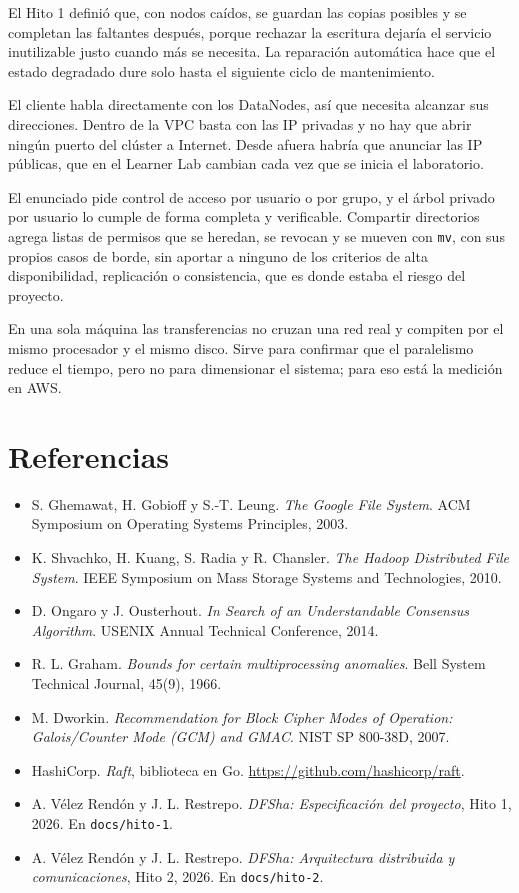 \documentclass[10pt]{article}
\begin{document}
 El Hito 1 definió que, con nodos caídos, se guardan las copias posibles y se completan las faltantes después, porque rechazar la escritura dejaría el servicio inutilizable justo cuando más se necesita. La reparación automática hace que el estado degradado dure solo hasta el siguiente ciclo de mantenimiento.

 El cliente habla directamente con los DataNodes, así que necesita alcanzar sus direcciones. Dentro de la VPC basta con las IP privadas y no hay que abrir ningún puerto del clúster a Internet. Desde afuera habría que anunciar las IP públicas, que en el Learner Lab cambian cada vez que se inicia el laboratorio.

 El enunciado pide control de acceso por usuario o por grupo, y el árbol privado por usuario lo cumple de forma completa y verificable. Compartir directorios agrega listas de permisos que se heredan, se revocan y se mueven con \texttt{mv}, con sus propios casos de borde, sin aportar a ninguno de los criterios de alta disponibilidad, replicación o consistencia, que es donde estaba el riesgo del proyecto.

 En una sola máquina las transferencias no cruzan una red real y compiten por el mismo procesador y el mismo disco. Sirve para confirmar que el paralelismo reduce el tiempo, pero no para dimensionar el sistema; para eso está la medición en AWS.

\separador

\section{Referencias}

\begin{itemize}
\item S. Ghemawat, H. Gobioff y S.-T. Leung. \emph{The Google File System}. ACM Symposium on Operating Systems Principles, 2003.
\item K. Shvachko, H. Kuang, S. Radia y R. Chansler. \emph{The Hadoop Distributed File System}. IEEE Symposium on Mass Storage Systems and Technologies, 2010.
\item D. Ongaro y J. Ousterhout. \emph{In Search of an Understandable Consensus Algorithm}. USENIX Annual Technical Conference, 2014.
\item R. L. Graham. \emph{Bounds for certain multiprocessing anomalies}. Bell System Technical Journal, 45(9), 1966.
\item M. Dworkin. \emph{Recommendation for Block Cipher Modes of Operation: Galois/Counter Mode (GCM) and GMAC}. NIST SP 800-38D, 2007.
\item HashiCorp. \emph{Raft}, biblioteca en Go. \url{https://github.com/hashicorp/raft}.
\item A. Vélez Rendón y J. L. Restrepo. \emph{DFSha: Especificación del proyecto}, Hito 1, 2026. En \texttt{docs/hito-1}.
\item A. Vélez Rendón y J. L. Restrepo. \emph{DFSha: Arquitectura distribuida y comunicaciones}, Hito 2, 2026. En \texttt{docs/hito-2}.
\end{itemize}
\end{document}
